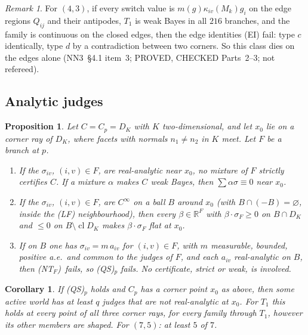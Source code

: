 \documentclass[11pt]{article}
\newtheorem{proposition}[theorem]{Proposition}
\newtheorem{corollary}[theorem]{Corollary}
\theoremstyle{definition}
\theoremstyle{remark}
\newtheorem{remark}[theorem]{Remark}
\newcommand{\R}{\mathbb R}
\newcommand{\cl}{\operatorname{cl}}
\newcommand{\src}[1]{\textsf{#1}}
\newcommand{\QS}{\textup{(QS)}}
\newcommand{\NT}{\textup{(NT$_F$)}}
\begin{document}
\begin{remark}\label{rem:NN3-edges}
For $(4,3)$, if every switch value is $m(g)\kappa_{iv}(M_k)g_i$ on the edge regions $Q_{ij}$ and their antipodes, $T_1$ is weak Bayes in all $216$ branches, and the family is continuous on the closed edges, then the edge identities (EI) fail: type $c$ identically, type $d$ by a contradiction between two corners. So this class dies on the edges alone (\src{NN3}~\S4.1 item~3; PROVED, CHECKED  Parts~2--3; not refereed).
\end{remark}

\subsection{Analytic judges}
\begin{proposition}\label{prop:analytic}
Let $C=C_p=D_K$ with $K$ two-dimensional, and let $x_0$ lie on a corner ray of $D_K$, where facets with normals $n_1\ne n_2$ in $K$ meet. Let $F$ be a branch at $p$.
\begin{enumerate}[label=(\alph*)]
\item If the $\sigma_{iv}$, $(i,v)\in F$, are real-analytic near $x_0$, no mixture of $F$ \emph{strictly} certifies $C$. If a mixture $\alpha$ makes $C$ \emph{weak} Bayes, then $\sum\alpha\sigma\equiv0$ near $x_0$.
\item If the $\sigma_{iv}$, $(i,v)\in F$, are $C^\infty$ on a ball $B$ around $x_0$ (with $B\cap(-B)=\varnothing$, inside the (LF) neighbourhood), then every $\beta\in\R^F$ with $\beta\cdot\sigma_F\ge0$ on $B\cap D_K$ and $\le0$ on $B\setminus\cl D_K$ makes $\beta\cdot\sigma_F$ flat at $x_0$.
\item If on $B$ one has $\sigma_{iv}=m\,a_{iv}$ for $(i,v)\in F$, with $m$ measurable, bounded, positive a.e.\ and common to the judges of $F$, and each $a_{iv}$ real-analytic on $B$, then \NT\ fails, so \QS$_p$ fails. No certificate, strict or weak, is involved.
\end{enumerate}
\end{proposition}
\begin{corollary}\label{cor:A2}
If \QS$_p$ holds and $C_p$ has a corner point $x_0$ as above, then some active world has at least $q$ judges that are not real-analytic at $x_0$. For $T_1$ this holds at every point of all three corner rays, for every family through $T_1$, however its other members are shaped. For $(7,5)$: at least $5$ of $7$.
\end{corollary}
\end{document}
